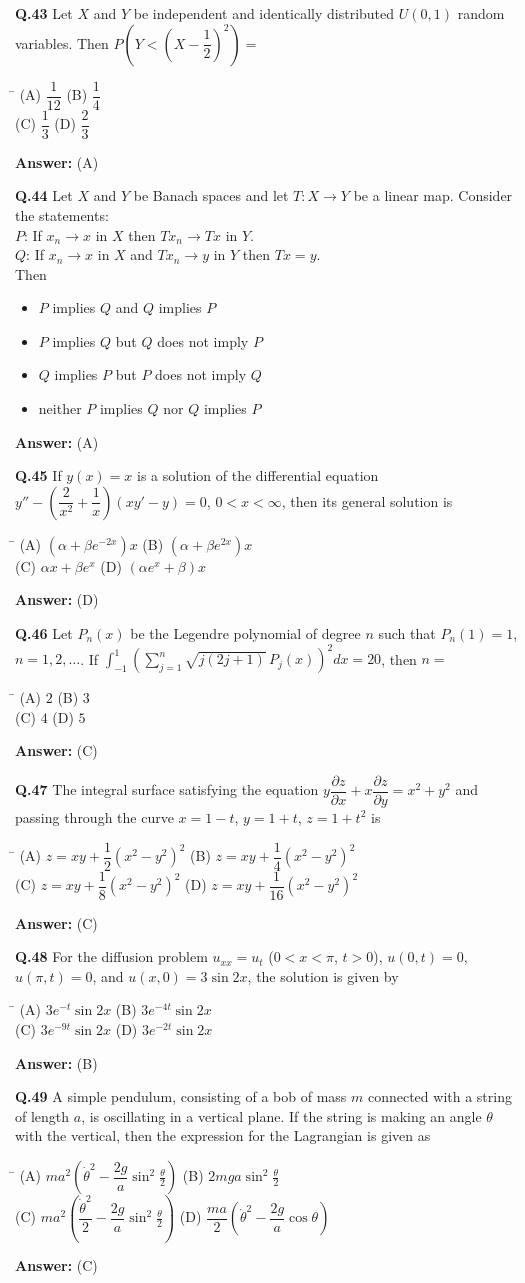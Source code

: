 \documentclass[11pt,a4paper]{article}
\newcommand{\optsfourA}[4]{%
  \begin{tabbing}
    \hspace{0.48\linewidth}\=\kill
    (A) #1 \> (B) #2 \\[2pt]
    (C) #3 \> (D) #4
  \end{tabbing}%
}
\newcommand{\optslistA}[4]{%
  \begin{itemize}
    \setlength{\itemsep}{2pt}\setlength{\parskip}{0pt}
    \item[(A)] #1
    \item[(B)] #2
    \item[(C)] #3
    \item[(D)] #4
  \end{itemize}%
}
\newcommand{\ans}[1]{\textbf{Answer:} #1\par\medskip}
\begin{document}
\textbf{Q.43} Let $X$ and $Y$ be independent and identically distributed $U(0, 1)$ random variables. Then $P\!\left(Y < \left(X - \dfrac{1}{2}\right)^2\right) =$
\optsfourA{$\dfrac{1}{12}$}{$\dfrac{1}{4}$}{$\dfrac{1}{3}$}{$\dfrac{2}{3}$}
\ans{(A)}

\textbf{Q.44} Let $X$ and $Y$ be Banach spaces and let $T : X \to Y$ be a linear map. Consider the statements:\\
$P$: If $x_n \to x$ in $X$ then $Tx_n \to Tx$ in $Y$.\\
$Q$: If $x_n \to x$ in $X$ and $Tx_n \to y$ in $Y$ then $Tx = y$.\\
Then
\optslistA{$P$ implies $Q$ and $Q$ implies $P$}{$P$ implies $Q$ but $Q$ does not imply $P$}{$Q$ implies $P$ but $P$ does not imply $Q$}{neither $P$ implies $Q$ nor $Q$ implies $P$}
\ans{(A)}

\textbf{Q.45} If $y(x) = x$ is a solution of the differential equation $y'' - \left(\dfrac{2}{x^2} + \dfrac{1}{x}\right)(xy' - y) = 0$, $0 < x < \infty$, then its general solution is
\optsfourA{$(\alpha + \beta e^{-2x})x$}{$(\alpha + \beta e^{2x})x$}{$\alpha x + \beta e^x$}{$(\alpha e^x + \beta)x$}
\ans{(D)}

\textbf{Q.46} Let $P_n(x)$ be the Legendre polynomial of degree $n$ such that $P_n(1) = 1$, $n = 1, 2, \dots$. If $\displaystyle\int_{-1}^{1} \left(\sum_{j=1}^{n} \sqrt{j(2j + 1)}\, P_j(x)\right)^2 dx = 20$, then $n =$
\optsfourA{$2$}{$3$}{$4$}{$5$}
\ans{(C)}

\textbf{Q.47} The integral surface satisfying the equation $y\dfrac{\partial z}{\partial x} + x\dfrac{\partial z}{\partial y} = x^2 + y^2$ and passing through the curve $x = 1 - t$, $y = 1 + t$, $z = 1 + t^2$ is
\optsfourA{$z = xy + \dfrac{1}{2}(x^2 - y^2)^2$}{$z = xy + \dfrac{1}{4}(x^2 - y^2)^2$}{$z = xy + \dfrac{1}{8}(x^2 - y^2)^2$}{$z = xy + \dfrac{1}{16}(x^2 - y^2)^2$}
\ans{(C)}

\textbf{Q.48} For the diffusion problem $u_{xx} = u_t$ ($0 < x < \pi$, $t > 0$), $u(0,t) = 0$, $u(\pi,t) = 0$, and $u(x,0) = 3\sin 2x$, the solution is given by
\optsfourA{$3 e^{-t}\sin 2x$}{$3 e^{-4t}\sin 2x$}{$3 e^{-9t}\sin 2x$}{$3 e^{-2t}\sin 2x$}
\ans{(B)}

\textbf{Q.49} A simple pendulum, consisting of a bob of mass $m$ connected with a string of length $a$, is oscillating in a vertical plane. If the string is making an angle $\theta$ with the vertical, then the expression for the Lagrangian is given as
\optsfourA{$ma^2\!\left(\dot{\theta}^2 - \dfrac{2g}{a}\sin^2\frac{\theta}{2}\right)$}{$2mga\sin^2\frac{\theta}{2}$}{$ma^2\!\left(\dfrac{\dot{\theta}^2}{2} - \dfrac{2g}{a}\sin^2\frac{\theta}{2}\right)$}{$\dfrac{ma}{2}\!\left(\dot{\theta}^2 - \dfrac{2g}{a}\cos\theta\right)$}
\ans{(C)}
\end{document}
